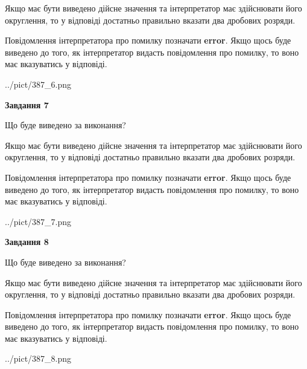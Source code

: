 \documentclass[12pt, ukrainian]{article}
\begin{document}
{\begin {Large}
Якщо має бути виведено дійсне значення та інтерпретатор має здійснювати його округлення, 
то у відповіді достатньо правильно вказати два дробових розряди.

Повідомлення інтерпретатора про помилку позначати \textbf{error}.
Якщо щось буде виведено до того, як інтерпретатор видасть повідомлення про помилку, 
то воно має вказуватись у відповіді. \par

\begin{center}
	{../pict/387_6.png}
\end{center}
\newpage

{\begin {center}\textbf{Завдання 7}\end {center}}\par
Що буде виведено за виконання? \par

Якщо має бути виведено дійсне значення та інтерпретатор має здійснювати його округлення, 
то у відповіді достатньо правильно вказати два дробових розряди.

Повідомлення інтерпретатора про помилку позначати \textbf{error}.
Якщо щось буде виведено до того, як інтерпретатор видасть повідомлення про помилку, 
то воно має вказуватись у відповіді. \par

\begin{center}
	{../pict/387_7.png}
\end{center}
\newpage

{\begin {center}\textbf{Завдання 8}\end {center}}\par
Що буде виведено за виконання? \par

Якщо має бути виведено дійсне значення та інтерпретатор має здійснювати його округлення, 
то у відповіді достатньо правильно вказати два дробових розряди.

Повідомлення інтерпретатора про помилку позначати \textbf{error}.
Якщо щось буде виведено до того, як інтерпретатор видасть повідомлення про помилку, 
то воно має вказуватись у відповіді. \par

\begin{center}
	{../pict/387_8.png}
\end{center}
\newpage


\end{Large}}
\end{document}

